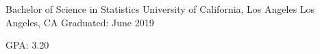 

\begin{cventries}

  \cventry
    {Bachelor of Science in Statistics} %
    {University of California, Los Angeles} %
    {Los Angeles, CA} %
    {Graduated: June 2019} %
    {
      \begin{cvitems} %
        \item {GPA: 3.20}
      \end{cvitems}
    }

\end{cventries}
